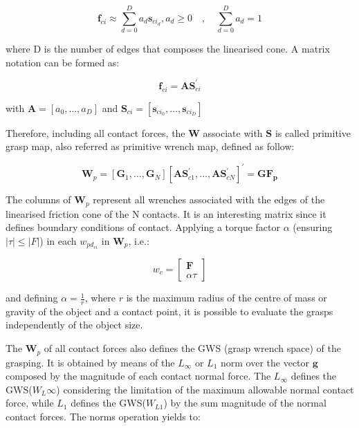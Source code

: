 \begin{equation}
	\mathbf{f}_{ci} \approx \sum_{d=0}^{D} a_{d} \mathbf{s}_{ci_d}, a_{d} \geq 0 \quad, \quad \sum_{d=0}^{D} a_{d}=1
\end{equation}

where D is the number of edges that composes the linearised cone. A matrix notation can be formed as:

\begin{equation}
	\mathbf{f}_{ci}=\mathbf{A} \mathbf{S}_{ci}^{\prime}
\end{equation}

with $\mathbf{A}=\left[a_{0}, \ldots, a_{D}\right]$ and $\mathbf{S}_{ci}=\left[\mathbf{s}_{ci_0}, \ldots, \mathbf{s}_{ci_D}\right]$

Therefore, including all contact forces, the $\mathbf{W}$ associate with $\mathbf{S}$ is called primitive grasp map, also referred as primitive wrench map, defined as follow:

\begin{equation}
	\mathbf{W}_{p}=\left[\mathbf{G}_{1}, \ldots, \mathbf{G}_{N}\right]\left[\mathbf{A} \mathbf{S}_{c 1}^{\prime}, \ldots, \mathbf{A} \mathbf{S}_{c N}^{\prime}\right]^{\prime}=\mathbf{G} \mathbf{F}_{\mathbf{p}}
\end{equation}

The columns of $\mathbf{W}_{p}$ represent all wrenches associated with the edges of the linearised friction cone of the N contacts. It is an interesting matrix since it defines boundary conditions of contact. Applying a torque factor $\alpha$ (ensuring $|\tau| \leq|F|$) in each $w_{pd_{ci}}$ in $\mathbf{W}_{p}$, i.e.:

\begin{equation}
	w_{c}=\left[\begin{array}{c}
		\boldsymbol{F} \\
		\alpha \tau
	\end{array}\right]
\end{equation}

and defining $\alpha=\frac{1}{r}$, where $r$ is the maximum radius of the centre of mass or gravity of the object and a contact point, it is possible to evaluate the grasps independently of the object size.

The $\mathbf{W}_p$ of all contact forces also defines the GWS (grasp wrench space) of the grasping. It is obtained by means of the $L_\infty$ or $L_1$ norm over the vector $\mathbf{g}$ composed by the magnitude of each contact normal force. The $L_\infty$ defines the GWS($W_L\infty$) considering the limitation of the maximum allowable normal contact force, while $L_1$ defines the GWS($W_{L1}$) by the sum magnitude of the normal contact forces. The norms operation yields to:


